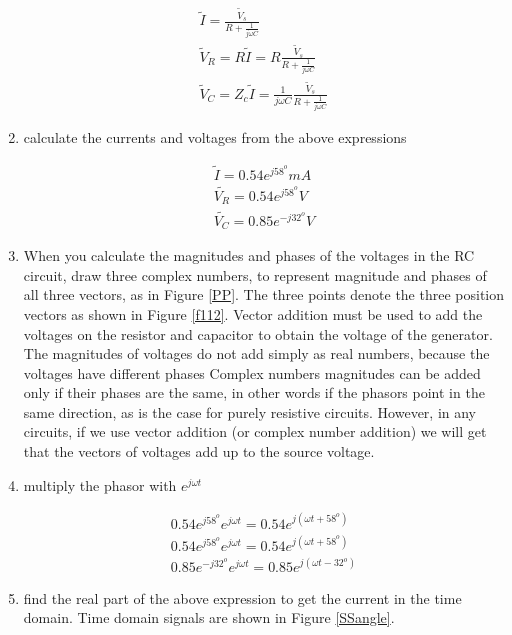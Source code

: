 \documentclass{ximera}
\begin{document}
\begin{example}
\begin{explanation}
\begin{enumerate}
\begin{eqnarray}
\tilde{I}  = \frac{\tilde{V}_s}{ R    + \frac{1}{j \omega C} } \\
\tilde{V}_R = R \tilde{I} = R \frac{\tilde{V}_s}{ R    + \frac{1}{j \omega C} }  \\
\tilde{V}_C = Z_c \tilde{I} =  \frac{1}{ j \omega C} \frac{\tilde{V}_s}{ R    + \frac{1}{j \omega C} }  
\end{eqnarray}

\item calculate the currents and voltages from the above expressions

\begin{eqnarray}
\tilde{I}  = 0.54 e^{j 58^o} \unit{mA} \\
\tilde{V_R} = 0.54  e^{j 58^o} \unit{V}\\
\tilde{V_C} =   0.85 e^{-j 32^o}  \unit{V}
\end{eqnarray}

\item When you calculate the magnitudes and phases of the voltages in the RC circuit, draw three complex numbers, to represent magnitude and phases of all three vectors, as in Figure \ref{PP}. The three points denote the three position vectors as shown in Figure \ref{f112}. Vector addition must be used to add the voltages on the resistor and capacitor to obtain the voltage of the generator. The  magnitudes of voltages do not add simply as real numbers, because the voltages have different phases Complex numbers magnitudes can be added only if their phases are the same, in other words if the phasors point in the same direction, as is the case for purely resistive circuits. However, in any circuits, if we use vector addition (or complex number addition) we will get that the vectors of voltages add up to the source voltage.
\item multiply the phasor with $e^{j \omega t}$  

\begin{eqnarray}
0.54 e^{j 58^o} e^{j \omega t} = 0.54 e^{j(\omega t + 58^o)}\\
0.54  e^{j 58^o} e^{j \omega t} =0.54  e^{j( \omega t + 58^o)}\\
 0.85 e^{-j 32^o}e^{j \omega t} =0.85 e^{j(\omega t - 32^o)}
\end{eqnarray}
\item find the real part of the above expression to get the current in the time domain. Time domain signals are shown in Figure \ref{SSangle}.


\end{enumerate}
\end{explanation}
\end{example}
\end{document}
